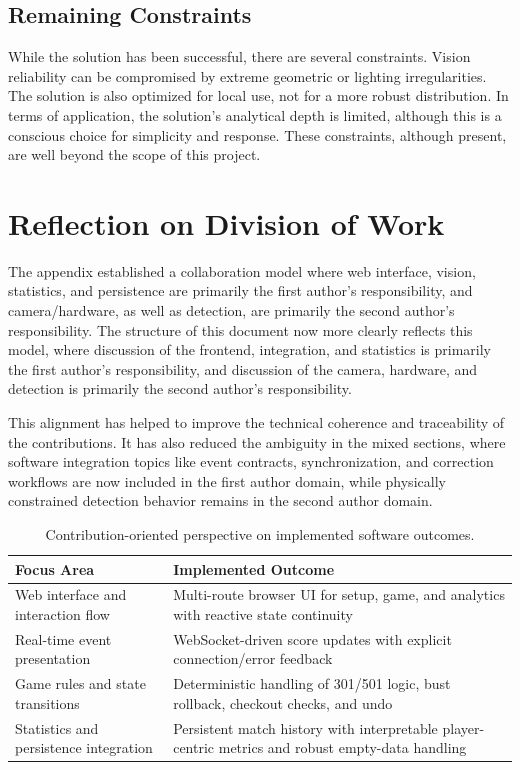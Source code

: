 \subsection{Remaining Constraints}
While the solution has been successful, there are several constraints. Vision reliability can be compromised by extreme geometric or lighting irregularities. The solution is also optimized for local use, not for a more robust distribution. In terms of application, the solution's analytical depth is limited, although this is a conscious choice for simplicity and response. These constraints, although present, are well beyond the scope of this project. 

\section{Reflection on Division of Work}
The appendix established a collaboration model where web interface, vision, statistics, and persistence are primarily the first author's responsibility, and camera/hardware, as well as detection, are primarily the second author's responsibility. The structure of this document now more clearly reflects this model, where discussion of the frontend, integration, and statistics is primarily the first author's responsibility, and discussion of the camera, hardware, and detection is primarily the second author's responsibility.

This alignment has helped to improve the technical coherence and traceability of the contributions. It has also reduced the ambiguity in the mixed sections, where software integration topics like event contracts, synchronization, and correction workflows are now included in the first author domain, while physically constrained detection behavior remains in the second author domain.

\begin{table}[H]
\centering
\begin{tabularx}{\linewidth}{@{}X X@{}}
\toprule
\textbf{Focus Area} & \textbf{Implemented Outcome} \\
\midrule
Web interface and interaction flow & Multi-route browser UI for setup, game, and analytics with reactive state continuity \\
Real-time event presentation & WebSocket-driven score updates with explicit connection/error feedback \\
Game rules and state transitions & Deterministic handling of 301/501 logic, bust rollback, checkout checks, and undo \\
Statistics and persistence integration & Persistent match history with interpretable player-centric metrics and robust empty-data handling \\
\bottomrule
\end{tabularx}
\caption{Contribution-oriented perspective on implemented software outcomes.}
\label{tab:summary_contribution_focus}
\end{table}

